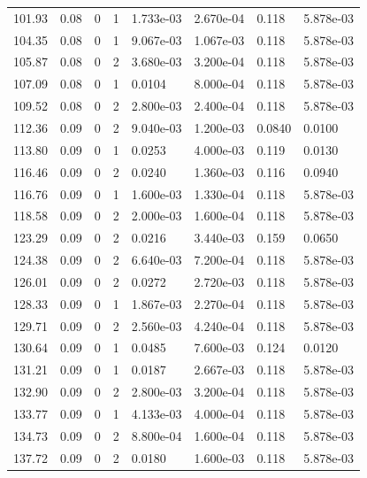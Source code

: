 \documentclass[preview]{standalone}
\begin{document}
{{{\begin{tabular}{L{1.2cm}C{1.2cm} C{0.3cm}C{0.5cm} C{1.4cm}C{1.4cm} C{1.4cm}C{1.4cm}}
  101.93  &  0.08  & 0     &  1 &  1.733e-03  & 2.670e-04  & 0.118 &  5.878e-03   \\ 
  104.35  &  0.08  & 0     &  1 &  9.067e-03  & 1.067e-03  & 0.118 &  5.878e-03   \\ 
  105.87  &  0.08  & 0     &  2 &  3.680e-03  & 3.200e-04  & 0.118 &  5.878e-03   \\ 
  107.09  &  0.08  & 0     &  1 &  0.0104  & 8.000e-04  & 0.118 &  5.878e-03   \\ 
  109.52  &  0.08  & 0     &  2 &  2.800e-03  & 2.400e-04  & 0.118 &  5.878e-03   \\ 
  112.36  &  0.09  & 0     &  2 &  9.040e-03  & 1.200e-03  & 0.0840 &  0.0100   \\ 
  113.80  &  0.09  & 0     &  1 &  0.0253  & 4.000e-03  & 0.119 &  0.0130   \\ 
  116.46  &  0.09  & 0     &  2 &  0.0240  & 1.360e-03  & 0.116 &  0.0940   \\ 
  116.76  &  0.09  & 0     &  1 &  1.600e-03  & 1.330e-04  & 0.118 &  5.878e-03   \\ 
  118.58  &  0.09  & 0     &  2 &  2.000e-03  & 1.600e-04  & 0.118 &  5.878e-03   \\ 
  123.29  &  0.09  & 0     &  2 &  0.0216  & 3.440e-03  & 0.159 &  0.0650   \\ 
  124.38  &  0.09  & 0     &  2 &  6.640e-03  & 7.200e-04  & 0.118 &  5.878e-03   \\ 
  126.01  &  0.09  & 0     &  2 &  0.0272  & 2.720e-03  & 0.118 &  5.878e-03   \\ 
  128.33  &  0.09  & 0     &  1 &  1.867e-03  & 2.270e-04  & 0.118 &  5.878e-03   \\ 
  129.71  &  0.09  & 0     &  2 &  2.560e-03  & 4.240e-04  & 0.118 &  5.878e-03   \\ 
  130.64  &  0.09  & 0     &  1 &  0.0485  & 7.600e-03  & 0.124 &  0.0120   \\ 
  131.21  &  0.09  & 0     &  1 &  0.0187  & 2.667e-03  & 0.118 &  5.878e-03   \\ 
  132.90  &  0.09  & 0     &  2 &  2.800e-03  & 3.200e-04  & 0.118 &  5.878e-03   \\ 
  133.77  &  0.09  & 0     &  1 &  4.133e-03  & 4.000e-04  & 0.118 &  5.878e-03   \\ 
  134.73  &  0.09  & 0     &  2 &  8.800e-04  & 1.600e-04  & 0.118 &  5.878e-03   \\ 
  137.72  &  0.09  & 0     &  2 &  0.0180  & 1.600e-03  & 0.118 &  5.878e-03   \\ 

\end{tabular}}}}
\end{document}
